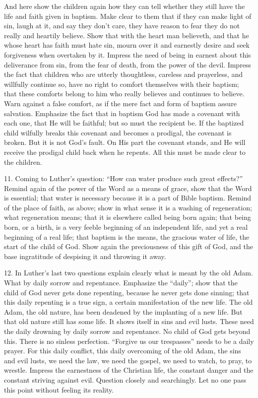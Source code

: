 And here show the children again how they can tell whether they still have the life and faith given in baptism. Make clear to them that if they can make light of sin, laugh at it, and say they don’t care, they have reason to fear they do not really and heartily believe. Show that with the heart man believeth, and that he whose heart has faith must hate sin, mourn over it and earnestly desire and seek forgiveness when overtaken by it. Impress the need of being in earnest about this deliverance from sin, from the fear of death, from the power of the devil. Impress the fact that children who are utterly thoughtless, careless and prayerless, and willfully continue so, have no right to comfort themselves with their baptism; that these comforts belong to him who really believes and continues to believe.  Warn against a false comfort, as if the mere fact and form of baptism assure salvation. Emphasize the fact that in baptism God has made a covenant with each one, that He will be faithful; but so must the recipient be. If the baptized child wilfully breaks this covenant and becomes a prodigal,
the covenant is broken. But it is not God’s fault. On His part the covenant stands, and He will receive the prodigal child back when he repents. All this must be made clear to the children.

11. Coming to Luther’s question: “How can water produce such great effects?” Remind again of the power of the Word as a means of grace, show that the Word is essential; that water is necessary because it is a part of Bible baptism.  Remind of the place of faith, as above; show in what sense it is a washing of regeneration; what regeneration means; that it is elsewhere called being born again; that being born, or a birth, is a very feeble beginning of an independent life, and yet a real beginning of a real life; that baptism is the means, the gracious water of life, the start of the child of God. Show again the preciousness of this gift of God, and the base ingratitude of despising it and throwing it away.

12. In Luther’s last two questions explain clearly what is meant by the old Adam. What by daily sorrow and repentance. Emphasize the “daily”; show that the child of God never gets done repenting, because he never gets done sinning;  that this daily repenting is a true sign, a certain manifestation of the new life. The old Adam, the old nature, has been deadened by the implanting of a new life. But that old nature still has some life. It shows itself in
sins and evil lusts. These need the daily drowning by daily sorrow and repentance. No child of God gets beyond this. There is no sinless perfection. “Forgive us our trespasses” needs to be a daily prayer. For this daily conflict, this daily overcoming of the old Adam, the sins and evil lusts, we need the law, we need the gospel, we need to watch, to pray, to wrestle. Impress the earnestness of the Christian life, the constant danger and the constant striving against evil. Question closely and searchingly. Let no one pass this point without feeling its reality.

